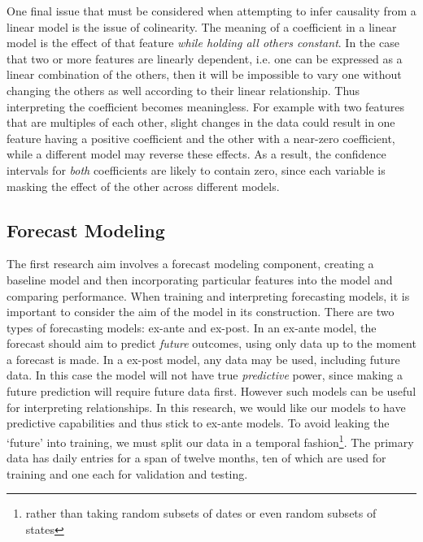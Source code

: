 \documentclass[11pt]{article}
\newcommand{\todo}[1]{\color{red}{\colorbox{pink}{\textbf{#1}}}\color{black}}
\begin{document}
One final issue that must be considered when attempting to infer causality from a linear model is the issue of colinearity. The meaning of a coefficient in a linear model is the effect of that feature \textit{while holding all others constant}. In the case that two or more features are linearly dependent, i.e. one can be expressed as a linear combination of the others, then it will be impossible to vary one without changing the others as well according to their linear relationship. Thus interpreting the coefficient becomes meaningless. For example with two features that are multiples of each other, slight changes in the data could result in one feature having a positive coefficient and the other with a near-zero coefficient, while a different model may reverse these effects. As a result, the confidence intervals for \textit{both} coefficients are likely to contain zero, since each variable is masking the effect of the other across different models. 










\subsection{Forecast Modeling}


The first research aim involves a forecast modeling component, creating a baseline model and then incorporating particular features into the model and comparing performance. When training and interpreting forecasting models, it is important to consider the aim of the model in its construction. There are two types of forecasting models: ex-ante and ex-post. In an ex-ante model, the forecast should aim to predict \textit{future} outcomes, using only data up to the moment a forecast is made. In a ex-post model, any data may be used, including future data. In this case the model will not have true \textit{predictive} power, since making a future prediction will require future data first. However such models can be useful for interpreting relationships. 
In this research, we would like our models to have predictive capabilities and thus stick to ex-ante models. 
%
To avoid leaking the `future' into training, we must split our data in a temporal fashion\footnote{rather than taking random subsets of dates or even random subsets of states}. The primary data has daily entries for a span of twelve months, ten of which are used for training and one each for validation and testing. 
\end{document}
